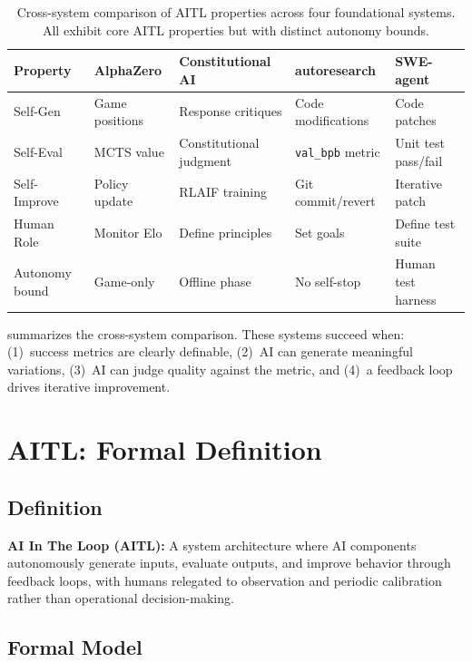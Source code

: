 \documentclass[11pt]{article}
\begin{document}
\begin{table}[t]
  \centering
  \caption{Cross-system comparison of AITL properties across four foundational systems. All exhibit core AITL properties but with distinct autonomy bounds.}
  \label{tab:comparison}
  \small
  \begin{tabular}{@{}lllll@{}}
    \toprule
    \textbf{Property} & \textbf{AlphaZero} & \textbf{Constitutional AI} & \textbf{autoresearch} & \textbf{SWE-agent} \\
    \midrule
    Self-Gen & Game positions & Response critiques & Code modifications & Code patches \\
    Self-Eval & MCTS value & Constitutional judgment & \texttt{val\_bpb} metric & Unit test pass/fail \\
    Self-Improve & Policy update & RLAIF training & Git commit/revert & Iterative patch \\
    Human Role & Monitor Elo & Define principles & Set goals & Define test suite \\
    Autonomy bound & Game-only & Offline phase & No self-stop & Human test harness \\
    \bottomrule
  \end{tabular}
\end{table}

 summarizes the cross-system comparison. These systems succeed when: (1)~success metrics are clearly definable, (2)~AI can generate meaningful variations, (3)~AI can judge quality against the metric, and (4)~a feedback loop drives iterative improvement.

\section{AITL: Formal Definition}
\label{sec:formal}

\subsection{Definition}

\textbf{AI In The Loop (AITL):} A system architecture where AI components autonomously generate inputs, evaluate outputs, and improve behavior through feedback loops, with humans relegated to observation and periodic calibration rather than operational decision-making.

\subsection{Formal Model}
\end{document}
